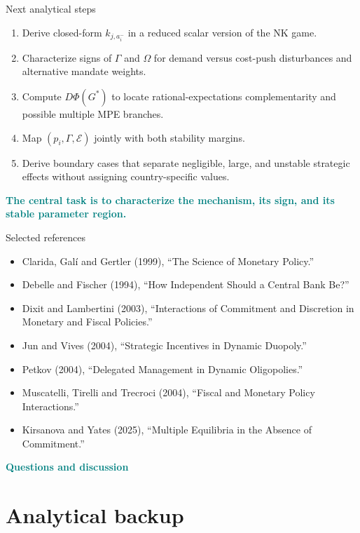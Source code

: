 \documentclass[10pt,aspectratio=169]{beamer}
\newcommand{\key}[1]{\textcolor{teal}{\textbf{#1}}}
\begin{document}
\begin{frame}{Next analytical steps}
\begin{enumerate}
  \item Derive closed-form $k_{j,a_i^-}$ in a reduced scalar version of the NK
        game.
  \item Characterize signs of $\Gamma$ and $\Omega$ for demand versus cost-push
        disturbances and alternative mandate weights.
  \item Compute $D\Phi(G^*)$ to locate rational-expectations complementarity and
        possible multiple MPE branches.
  \item Map $(p_i,\Gamma,\mathcal E)$ jointly with both stability margins.
  \item Derive boundary cases that separate negligible, large, and unstable
        strategic effects without assigning country-specific values.
\end{enumerate}
\vfill
\centering\large\key{The central task is to characterize the mechanism,
its sign, and its stable parameter region.}
\end{frame}

\begin{frame}{Selected references}
\footnotesize
\begin{itemize}
  \item Clarida, Gal\'i and Gertler (1999), ``The Science of Monetary Policy.''
  \item Debelle and Fischer (1994), ``How Independent Should a Central Bank Be?''
  \item Dixit and Lambertini (2003), ``Interactions of Commitment and
        Discretion in Monetary and Fiscal Policies.''
  \item Jun and Vives (2004), ``Strategic Incentives in Dynamic Duopoly.''
  \item Petkov (2004), ``Delegated Management in Dynamic Oligopolies.''
  \item Muscatelli, Tirelli and Trecroci (2004), ``Fiscal and Monetary Policy
        Interactions.''
  \item Kirsanova and Yates (2025), ``Multiple Equilibria in the Absence of
        Commitment.''
\end{itemize}
\vfill
\centering\large\key{Questions and discussion}
\end{frame}

\appendix
\section{Analytical backup}
\end{document}
